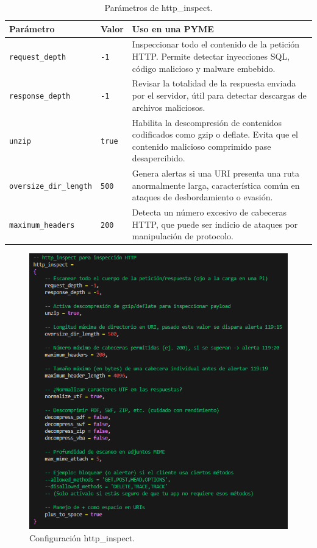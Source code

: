 \documentclass[11pt,a4paper,twoside]{report}
\begin{document}
\begin{table}[ht]
	\centering
	\begin{tabular}{l l p{7cm}}
		\hline
		\textbf{Parámetro} & \textbf{Valor} & \textbf{Uso en una PYME}\\
		\hline
		\texttt{request\_depth}       & \texttt{-1} & Inspeccionar todo el contenido de la petición HTTP. Permite detectar inyecciones SQL, código malicioso y malware embebido.\\
		\texttt{response\_depth}      & \texttt{-1} & Revisar la totalidad de la respuesta enviada por el servidor, útil para detectar descargas de archivos maliciosos.\\
		\texttt{unzip}                & \texttt{true} & Habilita la descompresión de contenidos codificados como gzip o deflate. Evita que el contenido malicioso comprimido pase desapercibido.\\
		\texttt{oversize\_dir\_length}& \texttt{500} & Genera alertas si una URI presenta una ruta anormalmente larga, característica común en ataques de desbordamiento o evasión.\\
		\texttt{maximum\_headers}     & \texttt{200} & Detecta un número excesivo de cabeceras HTTP, que puede ser indicio de ataques por manipulación de protocolo.\\
		\hline
	\end{tabular}
	\caption{Parámetros de http\_inspect.}
\end{table}

\begin{figure}[H]
	\centering
	\includegraphics[scale=0.5]{http_inspect/4.png}
	\caption{Configuración http\_inspect.}
\end{figure}
\end{document}
